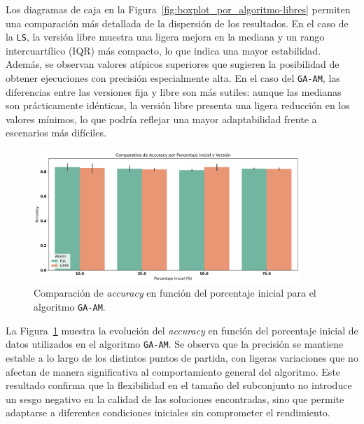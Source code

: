 Los diagramas de caja en la Figura~\ref{fig:boxplot_por_algoritmo-libres} permiten una comparación más detallada de la dispersión de los resultados.
En el caso de la \texttt{LS}, la versión libre muestra una ligera mejora en la mediana y un rango intercuartílico (IQR) más compacto, lo que indica una mayor estabilidad.
Además, se observan valores atípicos superiores que sugieren la posibilidad de obtener ejecuciones con precisión especialmente alta.
En el caso del \texttt{GA-AM}, las diferencias entre las versiones fija y libre son más sutiles: aunque las medianas son prácticamente idénticas,
la versión libre presenta una ligera reducción en los valores mínimos, lo que podría reflejar una mayor adaptabilidad frente a escenarios más difíciles.


\begin{figure}[htp]
    \centering
    \includegraphics[width=0.9\textwidth]{imagenes/evaluaciones/libres/am_por_pi.png}
    \caption{Comparación de \textit{accuracy} en función del porcentaje inicial para el algoritmo \texttt{GA-AM}.}
    \label{fig:am_por_pi}
\end{figure}

La Figura~\ref{fig:am_por_pi} muestra la evolución del \textit{accuracy} en función del porcentaje inicial de datos utilizados en el algoritmo \texttt{GA-AM}.
Se observa que la precisión se mantiene estable a lo largo de los distintos puntos de partida,
con ligeras variaciones que no afectan de manera significativa al comportamiento general del algoritmo.
Este resultado confirma que la flexibilidad en el tamaño del subconjunto no introduce un sesgo negativo en la calidad de las soluciones encontradas,
sino que permite adaptarse a diferentes condiciones iniciales sin comprometer el rendimiento.


